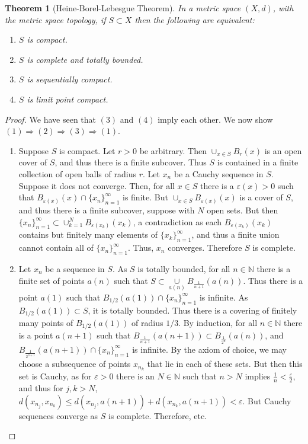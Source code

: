 \documentclass[oneside]{book}
\theoremstyle{mystyle}
\newtheorem{theorem}{Theorem}[section]
\begin{document}
\begin{theorem}[Heine-Borel-Lebesgue Theorem]
In a metric space $(X,d)$, with the metric space topology, if $S\subset X$ then the following are equivalent:
\begin{enumerate}
\item $S$ is compact.
\item $S$ is complete and totally bounded.
\item $S$ is sequentially compact.
\item $S$ is limit point compact.
\end{enumerate}
\end{theorem}
\begin{proof}
We have seen that $(3)$ and $(4)$ imply each other. We now show $(1)\Rightarrow (2)\Rightarrow (3) \Rightarrow (1)$.
\begin{enumerate}
\item Suppose $S$ is compact. Let $r>0$ be arbitrary. Then $\cup_{x\in S}B_{r}(x)$ is an open cover of $S$, and thus there is a finite subcover. Thus $S$ is contained in a finite collection of open balls of radius $r$. Let $x_n$ be a Cauchy sequence in $S$. Suppose it does not converge. Then, for all $x\in S$ there is a $\varepsilon(x)>0$ such that $B_{\varepsilon(x)}(x)\cap \{x_n\}_{n=1}^{\infty}$ is finite. But $\cup_{x\in S}B_{\varepsilon(x)}(x)$ is a cover of $S$, and thus there is a finite subcover, suppose with $N$ open sets. But then $\{x_n\}_{n=1}^{\infty}\subset \cup_{k=1}^{N}B_{\varepsilon(x_k)}(x_k)$, a contradiction as each $B_{\varepsilon(x_k)}(x_k)$ contains but finitely many elements of $\{x_k\}_{n=1}^{\infty}$, and thus a finite union cannot contain all of $\{x_n\}_{n=1}^{\infty}$. Thus, $x_n$ converges. Therefore $S$ is complete.
\item Let $x_n$ be a sequence in $S$. As $S$ is totally bounded, for all $n\in \mathbb{N}$ there is a finite set of points $a(n)$ such that $S\subset \underset{a(n)}\cup B_{\frac{1}{n+1}}(a(n))$. Thus there is a point $a(1)$ such that $B_{1/2}(a(1))\cap \{x_n\}_{n=1}^{\infty}$ is infinite. As $B_{1/2}(a(1))\subset S$, it is totally bounded. Thus there is a covering of finitely many points of $B_{1/2}(a(1))$ of radius $1/3$. By induction, for all $n\in \mathbb{N}$ there is a point $a(n+1)$ such that $B_{\frac{1}{n+1}}(a(n+1))\subset B_{\frac{1}{2^{n}}}(a(n))$, and $B_{\frac{1}{2^{n+1}}}(a(n+1))\cap \{x_n\}_{n=1}^{\infty}$ is infinite. By the axiom of choice, we may choose a subsequence of points $x_{n_k}$ that lie in each of these sets. But then this set is Cauchy, as for $\varepsilon>0$ there is an $N\in \mathbb{N}$ such that $n>N$ implies $\frac{1}{n}<\frac{\varepsilon}{2}$, and thus for $j,k>N$, $d(x_{n_j},x_{n_k})\leq d(x_{n_j},a(n+1))+d(x_{n_k},a(n+1))<\varepsilon$. But Cauchy sequences converge as $S$ is complete. Therefore, etc.

\end{enumerate}
\end{proof}
\end{document}
